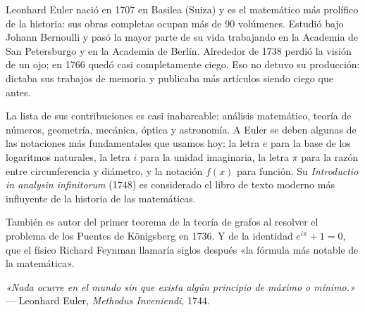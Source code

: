 \documentclass[11pt, letterpaper]{article}
\begin{document}
\vspace{0.7cm}

\begin{tcolorbox}[enhanced,breakable,colback=white,colframe=blockc,colbacktitle=blockc,
  coltitle=white,arc=4pt,leftrule=5pt,left=10pt,right=10pt,top=12pt,bottom=10pt,
  fonttitle=\bfseries,
  attach boxed title to top left={xshift=0.5cm,yshift*=-\tcboxedtitleheight/2},
  boxed title style={colframe=blockc,colback=blockc,arc=2pt},
  title={Leonhard Euler \hfill \normalfont\itshape 1707 — 1783}]

\begin{minipage}[t]{0.78\linewidth}
\vspace{0pt}
Leonhard Euler nació en 1707 en Basilea (Suiza) y es el matemático más prolífico de la historia: sus obras completas ocupan más de 90 volúmenes. Estudió bajo Johann Bernoulli y pasó la mayor parte de su vida trabajando en la Academia de San Petersburgo y en la Academia de Berlín. Alrededor de 1738 perdió la visión de un ojo; en 1766 quedó casi completamente ciego. Eso no detuvo su producción: dictaba sus trabajos de memoria y publicaba más artículos siendo ciego que antes.

\medskip
La lista de sus contribuciones es casi inabarcable: análisis matemático, teoría de números, geometría, mecánica, óptica y astronomía. A Euler se deben algunas de las notaciones más fundamentales que usamos hoy: la letra $e$ para la base de los logaritmos naturales, la letra $i$ para la unidad imaginaria, la letra $\pi$ para la razón entre circunferencia y diámetro, y la notación $f(x)$ para función. Su \textit{Introductio in analysin infinitorum} (1748) es considerado el libro de texto moderno más influyente de la historia de las matemáticas.

\medskip
También es autor del primer teorema de la teoría de grafos al resolver el problema de los Puentes de Königsberg en 1736. Y de la identidad $e^{i\pi}+1=0$, que el físico Richard Feynman llamaría siglos después «la fórmula más notable de la matemática».

\medskip
\textit{«Nada ocurre en el mundo sin que exista algún principio de máximo o mínimo.»} — Leonhard Euler, \textit{Methodus Inveniendi}, 1744.
\end{minipage}
\hfill
\begin{minipage}[t]{0.18\linewidth}
\vspace{0pt}
\end{minipage}
\end{tcolorbox}
\end{document}

